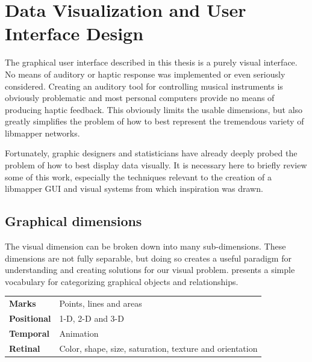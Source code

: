 \section{Data Visualization and User Interface Design}
\label{sec:data_viz}

The graphical user interface described in this thesis is a purely visual interface. No means of auditory or haptic response was implemented or even seriously considered. Creating an auditory tool for controlling musical instruments is obviously problematic and most personal computers provide no means of producing haptic feedback. This obviously limits the usable dimensions, but also greatly simplifies the problem of how to best represent the tremendous variety of libmapper networks.

Fortunately, graphic designers and statisticians have already deeply probed the problem of how to best display data visually. It is necessary here to briefly review some of this work, especially the techniques relevant to the creation of a libmapper GUI and visual systems from which inspiration was drawn.

\subsection{Graphical dimensions}

The visual dimension can be broken down into many sub-dimensions. These dimensions are not fully separable, but doing so creates a useful paradigm for understanding and creating solutions for our visual problem.  presents a simple vocabulary for categorizing graphical objects and relationships.

\begin{table}
	\centering
	\label{tab:graphical_relationships}
		\begin{tabular}{l  l}
		\hline\hline
		\textbf{Marks}& Points, lines and areas\\
		\textbf{Positional}& 1-D, 2-D and 3-D\\
		\textbf{Temporal}& Animation\\
		\textbf{Retinal}& Color, shape, size, saturation, texture and orientation\\
		\hline
		\end{tabular}
\end{table}

